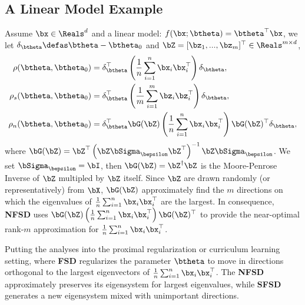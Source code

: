 \subsection{A Linear Model Example}
 Assume $ \bx \in \Reals^d$ and a linear model: $f(\bx; \btheta) = \btheta^{\top}\bx$, we let $\delta_{\btheta} \defas \btheta - \btheta_0$ and $\bZ = [\bz_1, ..., \bz_m]^{\top} \in \Reals^{m \times d}$,
\begin{align}
    \rho(\btheta, \btheta_0) &= \delta_{\btheta}^{\top}\left(\frac{1}{n}\sum_{i=1}^n \bx_i \bx_i^{\top}\right)\delta_{\btheta}, \\
    \rho_s(\btheta, \btheta_0) &= \delta_{\btheta}^{\top}\left(\frac{1}{m}\sum_{i=1}^m \bz_i \bz_i^{\top}\right)\delta_{\btheta}, \\
    \rho_n(\btheta, \btheta_0) &= \delta_{\btheta}^{\top} \bG(\bZ)\left( \frac{1}{n}\sum_{i=1}^n \bx_i \bx_i^{\top} \right) \bG(\bZ)^{\top} \delta_{\btheta},
\end{align}
where $\bG(\bZ) = \bZ^{\top} \left( \bZ \bSigma_{\bepsilon}  \bZ^{\top} \right)^{-1}\bZ \bSigma_{\bepsilon} $. We set $\bSigma_{\bepsilon} = \bI$, then $\bG(\bZ)=\bZ^{\dagger}\bZ$ is the Moore-Penrose Inverse of $\bZ$ multipled by $\bZ$ itself. Since $\bZ$ are drawn randomly (or representatively) from $\bX$, $\bG(\bZ)$ approximately find the $m$ directions on which the eigenvalues of $\frac{1}{n}\sum_{i=1}^n \bx_i \bx_i^{\top} $ are the largest. In consequence, \textbf{NFSD} uses 
$\bG(\bZ)\left( \frac{1}{n}\sum_{i=1}^n \bx_i \bx_i^{\top} \right) \bG(\bZ)^{\top}$ to provide the near-optimal rank-$m$ approximation for $\frac{1}{n}\sum_{i=1}^n \bx_i \bx_i^{\top}$.

Putting the analyses into the proximal regularization or curriculum learning setting, where \textbf{FSD} regularizes the parameter $\btheta$ to move in directions orthogonal to the largest eigenvectors of $\frac{1}{n}\sum_{i=1}^n \bx_i \bx_i^{\top}$. The \textbf{NFSD} approximately preserves its eigensystem for largest eigenvalues, while \textbf{SFSD} generates a new eigensystem mixed with unimportant directions.

